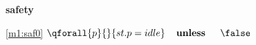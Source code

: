 \textbf{safety}
\begin{block}
\item[ \eqref{m1:saf0} ]{$\qforall{p}{}{st.p = idle}  \textbf{\quad unless \quad} \false$} %
\end{block}
